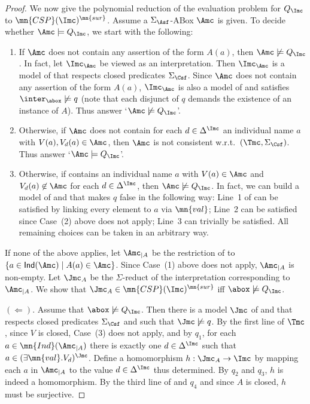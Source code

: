\documentclass{lmcs}
\theoremstyle{definition}
\begin{document}
\begin{proof}
  We now give the polynomial reduction of the evaluation problem for $Q_{\Imc}$ to $\mn{CSP}(\Imc)^{\mn{sur}}$. 
  Assume a $\Sigma_\Asf$-ABox $\Amc$ is given. To decide whether $\Amc\models Q_{\Imc}$, we start with the following:
  \begin{enumerate}

  \item If $\Amc$ does not contain any assertion of the form $A(a)$, then $\Amc \not\models Q_{\Imc}$. In fact, let
    $\Imc_\Amc$ be \Amc viewed as an interpretation.
    Then $\Imc_\Amc$ is a model of \Amc that respects closed predicates $\Sigma_\Csf$. Since $\Amc$ does not contain any assertion of the form $A(a)$, $\Imc_\Amc$ is also a model of \Tmc
    and satisfies $\inter_\abox\not\models q$ (note that each disjunct
    of $q$ demands the existence of an instance of $A$). Thus answer `$\Amc\not\models Q_{\Imc}$'.

  \item Otherwise, if $\Amc$ does not contain for each $d \in 
	\Delta^\Imc$ an individual name $a$ with $V(a),V_d(a)\in \Amc$, 
	then $\Amc$ is not consistent w.r.t.\ $(\Tmc,\Sigma_\Csf)$. Thus 
	answer `$\Amc\models Q_{\Imc}$'.

      \item Otherwise, if \Amc contains an individual name $a$ with
        $V(a)\in \Amc$ and $V_d(a)\not\in \Amc$ for each $d\in
        \Delta^{\Imc}$, then $\Amc \not\models Q_{\Imc}$. In fact,
        we can build a model of \Amc and \Tmc that makes $q$
        false in the following way:
        Line~1 of \Tmc can be satisfied by linking every element to
        $a$ via $\mn{val}$; Line~2 can be satisfied since Case~(2)
        above does not apply; Line~3 can trivially be satisfied. All
        remaining choices can be taken in an arbitrary way.

  \end{enumerate}
  If none of the above applies, let $\Amc_{|A}$ be the restriction
  of \Amc to $\{ a\in {\sf Ind}(\Amc) \mid A(a) \in \Amc\}$. Since Case~(1)
  above does not apply, $\Amc_{|A}$ is non-empty. Let $\Jmc_{A}$ be the $\Sigma$-reduct of the 
  interpretation corresponding to $\Amc_{|A}$.
  We show that $\Jmc_{A}\in \mn{CSP}(\Imc)^{\mn{sur}}$ iff $\abox\not\models Q_{\Imc}$.

  $(\Leftarrow)$. Assume that
  $\abox\not\models Q_{\Imc}$. Then there is a model
  $\Jmc$ of \Tmc and \Amc that respects closed predicates
  $\Sigma_{\Csf}$ and such that $\Jmc \not\models q$. By the first
  line of $\Tmc$, since $V$ is closed, Case~(3) does not apply, and by $q_{1}$, for each 
  $a \in \mn{Ind}(\Amc_{|A})$ there is
  exactly one $d \in \Delta^\Imc$ such that $a \in (\exists \mn{val}. V_d)^{\Jmc}$. 
  Define a homomorphism $h:\Jmc_{A} \rightarrow \Imc$ by
  mapping each $a$ in $\Amc_{|A}$ to the value $d \in \Delta^\Imc$ thus
  determined. By $q_{2}$ and $q_{3}$, $h$ is indeed a
  homomorphism. By the third line of \Tmc and $q_{4}$
  and since $A$ is closed, $h$ must be surjective.


\end{proof}
\end{document}
